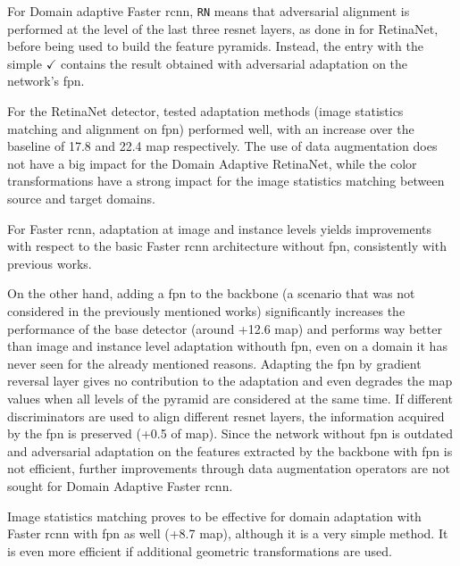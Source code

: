 \documentclass[%
    corpo=12pt,
    twoside,
    stile=classica,   
    tipotesi=magistrale,
    evenboxes,
    english,
	numerazioneromana,
]{toptesi}
\begin{document}
For Domain adaptive Faster \gls{rcnn}, \texttt{RN} means that adversarial alignment is performed at the level of the last three \gls{resnet} layers, as done in \cite{pasqualino2020unsupervised} for RetinaNet, before being used to build the feature pyramids. Instead, the entry with the simple $\checkmark$ contains the result obtained with adversarial adaptation on the network's \gls{fpn}.

\bigskip
For the RetinaNet detector, tested adaptation methods (image statistics matching and alignment on \gls{fpn}) performed well, with an increase over the baseline of 17.8 and 22.4 \gls{map} respectively. The use of data augmentation does not have a big impact for the Domain Adaptive RetinaNet, while the color transformations have a strong impact for the image statistics matching between source and target domains.

\bigskip
For Faster \gls{rcnn}, adaptation at image and instance levels yields improvements with respect to the basic Faster \gls{rcnn} architecture without \gls{fpn}, consistently with previous works\cite{abramov2020simple}\cite{chen2018domain}\cite{saito2019strongweak}.

\medskip
On the other hand, adding a \gls{fpn} to the backbone (a scenario that was not considered in the previously mentioned works) significantly increases the performance of the base detector (around +12.6 \acrshort{map}) and performs way better than image and instance level adaptation withouth \gls{fpn}, even on a domain it has never seen for the already mentioned reasons. Adapting the \gls{fpn} by gradient reversal layer gives no contribution to the adaptation and even degrades the \gls{map} values when all levels of the pyramid are considered at the same time. If different discriminators are used to align different \gls{resnet} layers, the information acquired by the \gls{fpn} is preserved (+0.5 of \gls{map}). Since the network without \gls{fpn} is outdated and adversarial adaptation on the features extracted by the backbone with \gls{fpn} is not efficient, further improvements through data augmentation operators are not sought for Domain Adaptive Faster \gls{rcnn}.

\medskip
Image statistics matching proves to be effective for domain adaptation with Faster \gls{rcnn} with \gls{fpn} as well (+8.7 \gls{map}), although it is a very simple method. It is even more efficient if additional geometric transformations are used.
\end{document}
